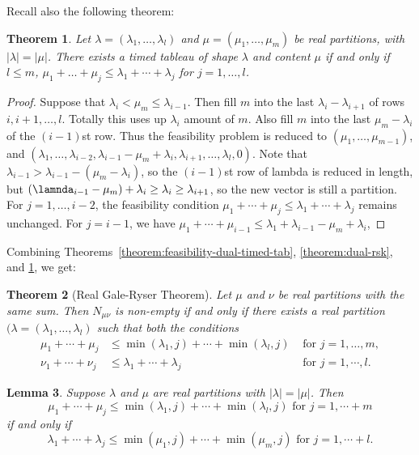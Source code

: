 \documentclass[12pt]{amsart}
\newtheorem{theorem}{Theorem}
\newtheorem{lemma}[theorem]{Lemma}
\theoremstyle{definition}
\begin{document}
Recall also the following theorem:
\begin{theorem}
  \label{theorem:feasibility-timed-tab}
  Let $\lambda=(\lambda_1,\dotsc,\lambda_l)$ and $\mu=(\mu_1,\dotsc,\mu_m)$ be real partitions, with $|\lambda|=|\mu|$.
  There exists a timed tableau of shape $\lambda$ and content $\mu$ if and only if $l\leq m$, $\mu_1+\dotsc+\mu_j\leq \lambda_1+\dotsb + \lambda_j$ for $j=1,\dotsc,l$.
\end{theorem}
\begin{proof}
  Suppose that $\lambda_i<\mu_m\leq \lambda_{i-1}$.
  Then fill $m$ into the last $\lambda_i-\lambda_{i+1}$ of rows $i, i+1,\dotsc, l$.
  Totally this uses up $\lambda_i$ amount of $m$.
  Also fill $m$ into the last $\mu_m-\lambda_i$ of the $(i-1)$st row.
  Thus the feasibility problem is reduced to $(\mu_1,\dotsc,\mu_{m-1})$, and $(\lambda_1,\dotsc,\lambda_{i-2}, \lambda_{i-1}-\mu_m +\lambda_i, \lambda_{i+1},\dotsc,\lambda_l,0)$.
  Note that $\lambda_{i-1} > \lambda_{i-1} - (\mu_m - \lambda_i)$, so the $(i-1)$st row of lambda is reduced in length,
  but $(\lamnda_{i-1}-\mu_m)+\lambda_i\geq \lambda_i\geq \lambda_{i+1}$, so the new vector is still a partition.
  For $j=1,\dotsc,i-2$, the feasibility condition $\mu_1+\dotsb + \mu_j \leq \lambda_1+\dotsb +\lambda_j$ remains unchanged.
  For $j=i-1$, we have $\mu_1+\dotsb+\mu_{i-1} \leq \lambda_1+\lambda_{i-1}-\mu_m+\lambda_i$,
\end{proof}
Combining Theorems~\ref{theorem:feasibility-dual-timed-tab}, \ref{theorem:dual-rsk}, and \ref{theorem:feasibility-timed-tab}, we get:
\begin{theorem}
  [Real Gale-Ryser Theorem]
  Let $\mu$ and $\nu$ be real partitions with the same sum.
  Then $N_{\mu\nu}$ is non-empty if and only if there exists a real partition $(\lambda=(\lambda_1,\dotsc,\lambda_l)$ such that both the conditions
  \begin{align*}
    \mu_1+\dotsb + \mu_j & \leq \min(\lambda_1,j)+\dotsb + \min(\lambda_l,j) & \text{ for } j = 1,\dotsc,m,\\
    \nu_1+\dotsb + \nu_j & \leq \lambda_1+\dotsb+\lambda_j & \text{ for } j=1,\dotsb,l.
  \end{align*}
\end{theorem}
\begin{lemma}
  Suppose $\lambda$ and $\mu$ are real partitions with $|\lambda|=|\mu|$.
  Then
  \begin{displaymath}
    \mu_1+\dotsb + \mu_j \leq \min(\lambda_1,j)+\dotsb+\min(\lambda_l,j) \text{ for } j=1,\dotsb+m
  \end{displaymath}
  if and only if
  \begin{displaymath}
    \lambda_1+\dotsb + \lambda_j \leq \min(\mu_1,j)+\dotsb + \min(\mu_m,j) \text{ for } j=1,\dotsb+l.
  \end{displaymath}
\end{lemma}
\end{document}
